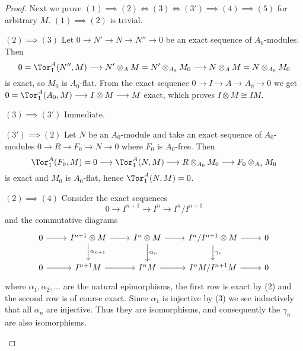 \documentclass[../main]{subfiles}
\begin{document}
\begin{proof}
Next we prove $(1)\implies (2)\iff (3)\iff (3') \implies (4) \implies (5)$ for arbitrary $M$. $(1)\implies (2)$ is trivial.
\begin{implyenumerate}
    \item[$(2)\implies (3)$]Let $0\longrightarrow N' \longrightarrow N \longrightarrow N'' \longrightarrow 0$ be an exact sequence of $A_0$-modules. Then \[0 = \Tor_1^A(N'',M) \longrightarrow N' \otimes_A M = N' \otimes_{A_0} M_0\longrightarrow N\otimes_A M = N\otimes_{A_0} M_0 \] is exact, so $M_0$ is $A_0$-flat. From the exact sequence $0\longrightarrow I\longrightarrow A\longrightarrow A_0\longrightarrow 0$ we get $0 = \Tor_1^A(A_0,M)\longrightarrow I\otimes M\longrightarrow M$ exact, which proves $I\otimes M\cong IM$.
    \item[$(3)\implies (3')$] Immediate.
    \item[$(3')\implies (2)$] Let $N$ be an $A_0$-module and take an exact sequence of $A_0$-modules $0\longrightarrow R\longrightarrow F_0\longrightarrow N\longrightarrow 0$ where $F_0$ is $A_0$-free. Then \[\Tor_1^A(F_0,M) = 0 \longrightarrow \Tor_1^A(N,M)\longrightarrow R\otimes_{A_0} M_0\longrightarrow F_0\otimes_{A_0} M_0\] is exact and $M_0$ is $A_0$-flat, hence $\Tor_1^A(N,M) = 0$.
    \item[$(2)\implies (4)$] Consider the exact sequences \[0\longrightarrow I^{n+1}\longrightarrow I^n\longrightarrow I^n/I^{n+1}\] and the commutative diagrams \[\begin{tikzcd}
	0 & {I^{n+1}\otimes M} & {I^n\otimes M} & {I^n/I^{n+1}\otimes M} & 0 \\
	0 & {I^{n+1} M} & {I^n M} & {I^nM/I^{n+1}M} & 0
	\arrow[from=1-1, to=1-2]
	\arrow[from=1-2, to=1-3]
	\arrow[from=1-3, to=1-4]
	\arrow[from=1-4, to=1-5]
	\arrow["{\alpha_{n+1}}", from=1-2, to=2-2]
	\arrow["{\alpha_n}", from=1-3, to=2-3]
	\arrow["{\gamma_n}", from=1-4, to=2-4]
	\arrow[from=2-1, to=2-2]
	\arrow[from=2-2, to=2-3]
	\arrow[from=2-3, to=2-4]
	\arrow[from=2-4, to=2-5]
    \end{tikzcd}\] where $\alpha_1,\alpha_2,\dots$ are the natural epimorphisms, the first row is exact by (2) and the second row is of course exact. Since $\alpha_1$ is injective by (3) we see inductively that all $\alpha_n$ are injective. Thus they are isomorphisms, and consequently the $\gamma_n$ are also isomorphisms.
\end{implyenumerate}


\end{proof}
\end{document}
